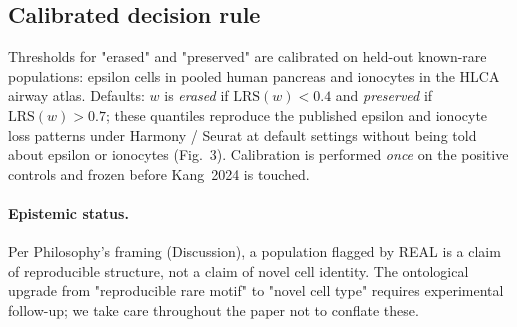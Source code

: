 \subsection{Calibrated decision rule}

Thresholds for "erased" and "preserved" are calibrated on held-out known-rare populations: epsilon cells in pooled human pancreas and ionocytes in the HLCA airway atlas.  Defaults: $w$ is \emph{erased} if $\mathrm{LRS}(w)<0.4$ and \emph{preserved} if $\mathrm{LRS}(w)>0.7$; these quantiles reproduce the published epsilon and ionocyte loss patterns under Harmony / Seurat at default settings without being told about epsilon or ionocytes (Fig.~3).  Calibration is performed \emph{once} on the positive controls and frozen before Kang~2024 is touched.





\paragraph{Epistemic status.} Per Philosophy's framing (Discussion), a population flagged by REAL is a claim of reproducible structure, not a claim of novel cell identity.  The ontological upgrade from "reproducible rare motif" to "novel cell type" requires experimental follow-up; we take care throughout the paper not to conflate these.
